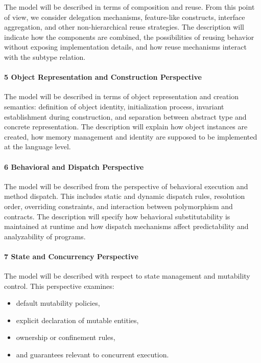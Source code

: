 The model will be described in terms of composition and reuse. From this point of view, we consider delegation mechanisms, feature-like constructs, interface aggregation, and other non-hierarchical reuse strategies.
The description will indicate how the components are combined, the possibilities of reusing behavior without exposing implementation details, and how reuse mechanisms interact with the subtype relation.

\paragraph{5 Object Representation and Construction Perspective}

The model will be described in terms of object representation and creation semantics: definition of object identity, initialization process, invariant establishment during construction, and separation between abstract type and concrete representation.
The description will explain how object instances are created, how memory management and identity are supposed to be implemented at the language level.

\paragraph{6 Behavioral and Dispatch Perspective}

The model will be described from the perspective of behavioral execution and method dispatch. This includes static and dynamic dispatch rules, resolution order, overriding constraints, and interaction between polymorphism and contracts.
The description will specify how behavioral substitutability is maintained at runtime and how dispatch mechanisms affect predictability and analyzability of programs.

\paragraph{7 State and Concurrency Perspective}

The model will be described with respect to state management and mutability control. This perspective examines:
\begin{itemize}
    \item default mutability policies,
    \item explicit declaration of mutable entities,
    \item ownership or confinement rules,
    \item and guarantees relevant to concurrent execution.
\end{itemize}

